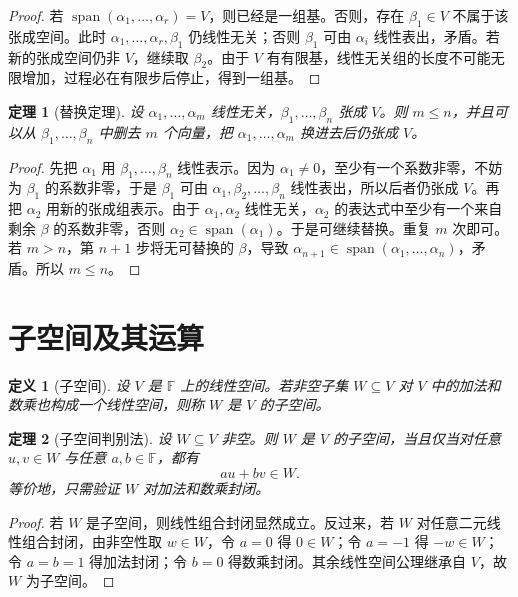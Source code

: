 \documentclass[UTF8,openany,zihao=-4]{ctexbook}
\theoremstyle{cnplain}
\newtheorem{definition}{定义}[chapter]
\newtheorem{theorem}{定理}[chapter]
\newcommand{\F}{\mathbb F}
\newcommand{\Span}{\operatorname{span}}
\begin{document}
\begin{proof}
若 $\Span(\alpha_1,
\ldots,\alpha_r)=V$，则已经是一组基。否则，存在 $\beta_1\in V$ 不属于该张成空间。此时 $\alpha_1,
\ldots,\alpha_r,\beta_1$ 仍线性无关；否则 $\beta_1$ 可由 $\alpha_i$ 线性表出，矛盾。若新的张成空间仍非 $V$，继续取 $\beta_2$。由于 $V$ 有有限基，线性无关组的长度不可能无限增加，过程必在有限步后停止，得到一组基。
\end{proof}

\begin{theorem}[替换定理]
设 $\alpha_1,\ldots,\alpha_m$ 线性无关，$\beta_1,\ldots,\beta_n$ 张成 $V$。则 $m\le n$，并且可以从 $\beta_1,
\ldots,\beta_n$ 中删去 $m$ 个向量，把 $\alpha_1,\ldots,\alpha_m$ 换进去后仍张成 $V$。
\end{theorem}

\begin{proof}
先把 $\alpha_1$ 用 $\beta_1,
\ldots,\beta_n$ 线性表示。因为 $\alpha_1\ne 0$，至少有一个系数非零，不妨为 $\beta_1$ 的系数非零，于是 $\beta_1$ 可由 $\alpha_1,\beta_2,
\ldots,\beta_n$ 线性表出，所以后者仍张成 $V$。再把 $\alpha_2$ 用新的张成组表示。由于 $\alpha_1,\alpha_2$ 线性无关，$\alpha_2$ 的表达式中至少有一个来自剩余 $\beta$ 的系数非零，否则 $\alpha_2\in\Span(\alpha_1)$。于是可继续替换。重复 $m$ 次即可。若 $m>n$，第 $n+1$ 步将无可替换的 $\beta$，导致 $\alpha_{n+1}\in\Span(\alpha_1,
\ldots,\alpha_n)$，矛盾。所以 $m\le n$。
\end{proof}

\section{子空间及其运算}

\begin{definition}[子空间]
设 $V$ 是 $\F$ 上的线性空间。若非空子集 $W\subseteq V$ 对 $V$ 中的加法和数乘也构成一个线性空间，则称 $W$ 是 $V$ 的子空间。
\end{definition}

\begin{theorem}[子空间判别法]
设 $W\subseteq V$ 非空。则 $W$ 是 $V$ 的子空间，当且仅当对任意 $u,v\in W$ 与任意 $a,b\in\F$，都有
\[
au+bv\in W.
\]
等价地，只需验证 $W$ 对加法和数乘封闭。
\end{theorem}

\begin{proof}
若 $W$ 是子空间，则线性组合封闭显然成立。反过来，若 $W$ 对任意二元线性组合封闭，由非空性取 $w\in W$，令 $a=0$ 得 $0\in W$；令 $a=-1$ 得 $-w\in W$；令 $a=b=1$ 得加法封闭；令 $b=0$ 得数乘封闭。其余线性空间公理继承自 $V$，故 $W$ 为子空间。
\end{proof}
\end{document}
